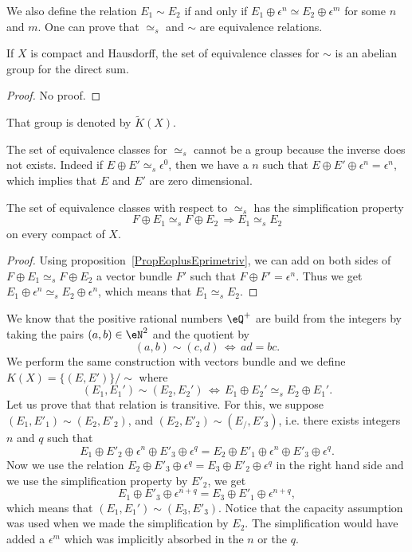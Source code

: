 We also define the relation $E_1\sim E_2$ if and only if $E_1\oplus\epsilon^n\simeq E_2\oplus\epsilon^m$ for some $n$ and $m$. One can prove that $\simeq_s$ and $\sim$ are equivalence relations.

\begin{proposition}
	If $X$ is compact and Hausdorff, the set of equivalence classes for $\sim$ is an abelian group for the direct sum.
\end{proposition}

\begin{proof}
	No proof.
\end{proof}
That group is denoted by $\tilde K(X)$.

The set of equivalence classes for $\simeq_s$ cannot be a group because the inverse does not exists. Indeed if $E\oplus E'\simeq_s\epsilon^0$, then we have a $n$ such that $E\oplus E'\oplus\epsilon^n=\epsilon^n$, which implies that $E$ and $E'$ are zero dimensional.

\begin{proposition}
	The set of equivalence classes with respect to $\simeq_s$ has the simplification property
	\begin{equation}
		F\oplus E_1\simeq_s F\oplus E_2\,\Rightarrow E_1\simeq_s E_2
	\end{equation}
	on every compact of $X$.
\end{proposition}

\begin{proof}
	Using proposition~\ref{PropEoplusEprimetriv}, we can add on both sides of $F\oplus E_1\simeq_s F\oplus E_2$ a vector bundle $F'$ such that $F\oplus F'=\epsilon^n$. Thus we get $E_1\oplus\epsilon^n\simeq_s E_2\oplus\epsilon^n$, which means that $E_1\simeq_s E_2$.
\end{proof}

We know that the positive rational numbers $\eQ^+$ are build from the integers by taking the pairs $(a,b)\in\eN^2$ and the quotient by
\[
	(a,b)\sim(c,d)\,\Leftrightarrow\, ad=bc.
\]
We perform the same construction with vectors bundle and we define $K(X)=\{ (E,E') \}/\sim$ where
\begin{equation}
	(E_1,E_1')\sim (E_2,E_2')\,\Leftrightarrow\, E_1\oplus E_2'\simeq_s E_2\oplus E_1'.
\end{equation}
Let us prove that that relation is transitive. For this, we suppose $(E_1,E'_1)\sim (E_2,E'_2)$, and $(E_2,E'_2)\sim(E_/,E'_3)$, i.e. there exists integers $n$ and $q$ such that
\[
	E_1\oplus E'_2\oplus\epsilon^n\oplus E'_3\oplus\epsilon^q	=E_2\oplus E'_1\oplus\epsilon^n\oplus E'_3\oplus\epsilon^q.
\]
Now we use the relation $E_2\oplus E'_3\oplus\epsilon^q=E_3\oplus E'_2\oplus\epsilon^q$ in the right hand side and we use the simplification property by $E'_2$, we get
\[
	E_1\oplus E'_3\oplus\epsilon^{n+q}=E_3\oplus E'_1\oplus\epsilon^{n+q},
\]
which means that $(E_1,E_1')\sim (E_3,E'_3)$. Notice that the capacity assumption was used when we made the simplification by $E_2$. The simplification would have added a $\epsilon^m$ which was implicitly absorbed in the $n$ or the $q$.

